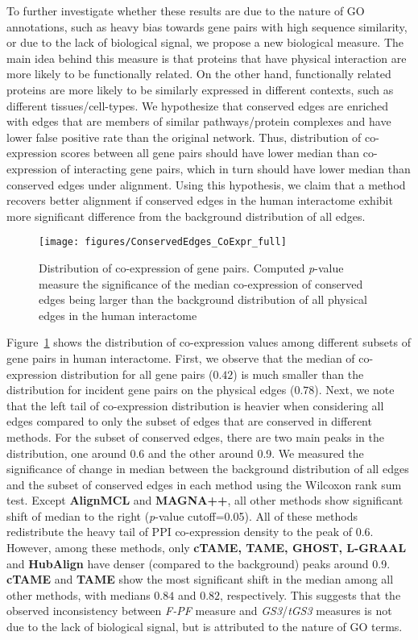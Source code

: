 \documentclass[10pt, journal, compsoc, final]{IEEEtran}
\begin{document}
To further investigate whether these results are due to the nature of GO annotations, such as heavy bias towards gene pairs with high sequence similarity,  or due to the lack of biological signal, we propose a new biological measure. The main idea behind this measure is that proteins that have physical interaction are more likely to be functionally related. On the other hand, functionally related proteins are more likely to be similarly expressed in different contexts, such as different tissues/cell-types. We hypothesize that conserved edges are enriched with edges that are members of similar pathways/protein complexes and have lower false positive rate than the original network. Thus, distribution of co-expression scores between all gene pairs should have lower median than co-expression of interacting gene pairs, which in turn should have lower median than conserved edges under alignment. Using this hypothesis, we claim that a method recovers better alignment if conserved edges in the human interactome exhibit more significant difference from the background distribution of all edges.


\begin{figure}[!t]
\centering
\texttt{[image: figures/ConservedEdges\_CoExpr\_full]}
\caption{Distribution of co-expression of gene pairs. Computed \emph{p}-value measure the significance of the median co-expression of conserved edges being larger than the background distribution of all physical edges in the human interactome}
\label{fig:CoExp}
\end{figure}

Figure~\ref{fig:CoExp} shows the distribution of co-expression values among different subsets of gene pairs in human interactome. First, we observe that the median of co-expression distribution for all gene pairs ($0.42$) is much smaller than the distribution for incident gene pairs on the physical edges ($0.78$). Next, we note that the left tail of co-expression distribution is heavier when considering all edges compared to only the subset of edges that are conserved in different methods.
For the subset of conserved edges, there are two main peaks in the distribution, one around 0.6 and the other around 0.9. We measured the significance of change in median between the background distribution of all edges and the subset of conserved edges in each method using the Wilcoxon rank sum test. Except \textbf{AlignMCL} and \textbf{MAGNA++}, all other methods show significant shift of median to the right (\emph{p}-value cutoff=0.05). All of these methods redistribute the heavy tail of PPI co-expression density to the peak of 0.6. However, among these methods, only \textbf{cTAME, TAME, GHOST, L-GRAAL} and \textbf{HubAlign} have denser (compared to the background) peaks around 0.9. \textbf{cTAME} and \textbf{TAME} show the most significant shift in the median among all other methods, with medians $0.84$ and   $0.82$, respectively. This suggests that the observed inconsistency between \textit{F-PF} measure and \textit{GS3}/\textit{tGS3} measures is not due to the lack of biological signal, but is attributed to the nature of GO terms.
\end{document}
